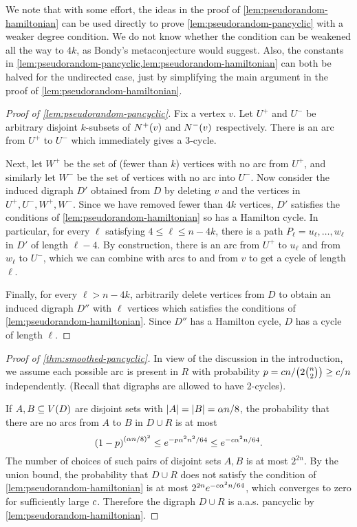 \documentclass[11pt,english]{article}
\theoremstyle{plain}
\theoremstyle{definition}
\theoremstyle{definition}
\theoremstyle{plain}
\theoremstyle{plain}
\theoremstyle{plain}
\theoremstyle{plain}
\theoremstyle{remark}
\theoremstyle{remark}
\let\originalleft\left
\let\originalright\right
\renewcommand{\left}{\mathopen{}\mathclose\bgroup\originalleft}
\renewcommand{\right}{\aftergroup\egroup\originalright}
\begin{document}
We note that with some effort, the ideas in the proof of
\ref{lem:pseudorandom-hamiltonian} can be used directly to prove
 \ref{lem:pseudorandom-pancyclic} with a weaker degree condition.
We do not know whether the condition can be weakened all the way to
$4k$, as Bondy's metaconjecture would suggest. Also, the constants in \ref{lem:pseudorandom-pancyclic,lem:pseudorandom-hamiltonian}
can both be halved for the undirected case, just by simplifying the
main argument in the proof of \ref{lem:pseudorandom-hamiltonian}.

\begin{proof}
[Proof of \ref{lem:pseudorandom-pancyclic}]Fix a vertex $v$. Let
$U^{+}$ and $U^{-}$ be arbitrary disjoint $k$-subsets of $N^{+}\left(v\right)$
and $N^{-}\left(v\right)$ respectively. There is an arc from $U^{+}$
to $U^{-}$ which immediately gives a 3-cycle.

Next, let $W^{+}$ be the set of (fewer than $k$) vertices with no
arc from $U^{+}$, and similarly let $W^{-}$ be the set of vertices
with no arc into $U^{-}$. Now consider the induced digraph $D'$
obtained from $D$ by deleting $v$ and the vertices in $U^{+},U^{-},W^{+},W^{-}$.
Since we have removed fewer than $4k$ vertices, $D'$ satisfies the
conditions of \ref{lem:pseudorandom-hamiltonian} so has a Hamilton
cycle. In particular, for every $\ell$ satisfying $4\le\ell\le n-4k$,
there is a path $P_{\ell}=u_{\ell},\dots, w_{\ell}$ in $D'$ of length
$\ell-4$. By construction, there is an arc from $U^{+}$ to $u_{\ell}$
and from $w_{\ell}$ to $U^{-}$, which we can combine with arcs to
and from $v$ to get a cycle of length $\ell$.

Finally, for every $\ell>n-4k$, arbitrarily delete vertices from
$D$ to obtain an induced digraph $D''$ with $\ell$ vertices which
satisfies the conditions of \ref{lem:pseudorandom-hamiltonian}. Since
$D''$ has a Hamilton cycle, $D$ has a cycle of length $\ell$.
\end{proof}

\begin{proof}
[Proof of \ref{thm:smoothed-pancyclic}]In view of the discussion
in the introduction, we assume each possible arc is present in $R$
with probability $p=\cdi n/\left(2{n \choose 2}\right)\ge\cdi/n$ independently. (Recall that digraphs are allowed to have 2-cycles).

If $A,B\subseteq V\left(D\right)$ are disjoint sets with $\left|A\right|=\left|B\right|=\alpha n/8$,
the probability that there are no arcs from $A$ to $B$ in $D\cup R$
is at most
\[
\left(1-p\right)^{\left(\alpha n/8\right)^{2}}\le e^{-p\alpha^{2}n^{2}/64}\le e^{-\cdi\alpha^{2}n/64}.
\]
The number of choices of such pairs of disjoint sets $A,B$ is at most $2^{2n}$. By the union bound,
the probability that $D\cup R$ does not satisfy the condition of
\ref{lem:pseudorandom-hamiltonian} is at most $2^{2n}e^{-c\alpha^{2}n/64}$, which 
converges to zero for sufficiently large $c$. Therefore the digraph $D\cup R$ is a.a.s. 
pancyclic by \ref{lem:pseudorandom-hamiltonian}.\end{proof}
\end{document}
